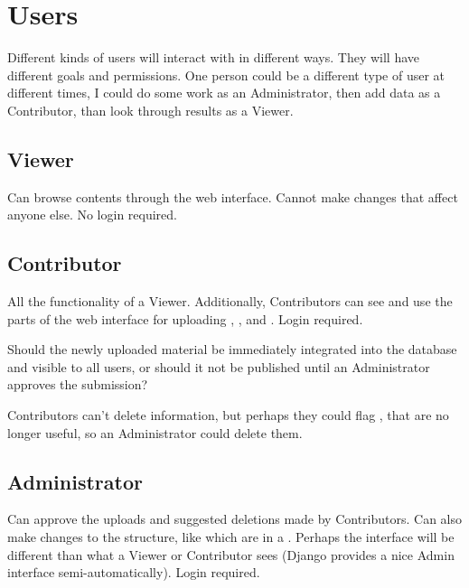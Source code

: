 \section{Users}

Different kinds of users will interact with \phycomb in different ways.
They will have different goals and permissions.
One person could be a different type of user at different times, \eg I could do some work as an Administrator, then add data as a Contributor, than look through results as a Viewer.

\subsection{Viewer}

Can browse \phycomb contents through the web interface.
Cannot make changes that affect anyone else.
No login required.

\subsection{Contributor}
\label{sec:users_contributor}

All the functionality of a Viewer.
Additionally, Contributors can see and use the parts of the web interface for uploading \Elements, \Methods, and \Performance.
Login required.

Should the newly uploaded material be immediately integrated into the database and visible to all users, or should it not be published until an Administrator approves the submission?

Contributors can't delete information, but perhaps they could flag \Elements, \etc that are no longer useful, so an Administrator could delete them.

\subsection{Administrator}

Can approve the uploads and suggested deletions made by Contributors.
Can also make changes to the structure, like which \Elements are in a \Benchmark.
Perhaps the interface will be different than what a Viewer or Contributor sees (\eg Django provides a nice Admin interface semi-automatically).
Login required.

